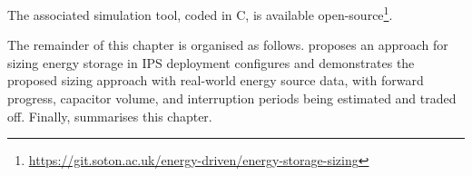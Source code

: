 The associated simulation tool, coded in C, is available open-source\footnote{\url{https://git.soton.ac.uk/energy-driven/energy-storage-sizing}}. 

The remainder of this chapter is organised as follows. 
 proposes an approach for sizing energy storage in IPS deployment 
 configures and demonstrates the proposed sizing approach with real-world energy source data, with forward progress, capacitor volume, and interruption periods being estimated and traded off.  
Finally,  summarises this chapter. 
